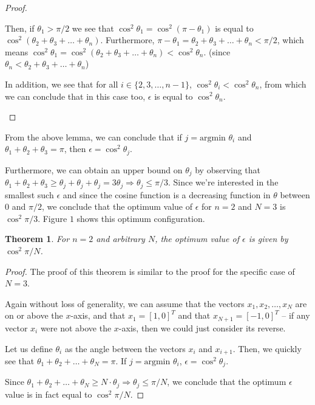 \documentclass[11pt,letterpaper,twoside,english]{article}
\theoremstyle{theorem}
\newtheorem{theorem}{Theorem}[section]
\theoremstyle{remark}
\begin{document}
\begin{proof}
\begin{itemize}
Then, if $\theta_1 > \pi/2$ we see that $\cos^2 \theta_1 = \cos^2 (\pi - \theta_1)$ is equal to $\cos^2 (\theta_2 + \theta_3 + \ldots + \theta_n)$. Furthermore, $\pi - \theta_1 = \theta_2 + \theta_3 + \ldots + \theta_n < \pi/2$, which means $\cos^2 \theta_1 = \cos^2 (\theta_2 + \theta_3 + \ldots + \theta_n) < \cos^2 \theta_n$. (since $\theta_n < \theta_2 + \theta_3 + \ldots + \theta_n$)

In addition, we see that for all $i \in \{2, 3, \ldots, n-1\}$, $\cos^2 \theta_i < \cos^2 \theta_n$, from which we can conclude that in this case too, $\epsilon$ is equal to $\cos^2 \theta_n$.

\end{itemize}
\end{proof}

From the above lemma, we can conclude that if $j = \text{argmin } \theta_i$ and $\theta_1 + \theta_2 + \theta_3 = \pi$, then $\epsilon = \cos^2 \theta_j$.

Furthermore, we can obtain an upper bound on $\theta_j$ by observing that $\theta_ 1 + \theta_ 2 + \theta_3 \geq \theta_ j + \theta_j + \theta_j = 3 \theta_j \Rightarrow \theta_j \leq \pi/3$. Since we're interested in the smallest such $\epsilon$ and since the cosine function is a decreasing function in $\theta$ between $0$ and $\pi/2$, we conclude that the optimum value of $\epsilon$ for $n=2$ and $N=3$ is $\cos^2 \pi / 3$. Figure $1$ shows this optimum configuration.

\begin{theorem}
For $n=2$ and arbitrary $N$, the optimum value of $\epsilon$ is given by $\cos^2 \pi/N$.
\end{theorem}

\begin{proof}
The proof of this theorem is similar to the proof for the specific case of $N=3$.

Again without loss of generality, we can assume that the vectors $x_1, x_2, \ldots, x_N$ are on or above the $x$-axis, and that $x_1 = [1,0]^T$ and that $x_{N+1} = [-1,0]^T$ -- if any vector $x_i$ were not above the $x$-axis, then we could just consider its reverse.

Let us define $\theta_i$ as the angle between the vectors $x_i$ and $x_{i+1}$. Then, we quickly see that $\theta_1 + \theta_2 + \ldots + \theta_N = \pi$. If $j = \text{argmin } \theta_i$, $\epsilon = \cos^2 \theta_j$.

Since $\theta_ 1 + \theta_2 + \ldots + \theta_N \geq N \cdot \theta_j \Rightarrow \theta_j \leq \pi/N$, we conclude that the optimum $\epsilon$ value is in fact equal to $\cos^2 \pi/N$.
\end{proof}
\end{document}

